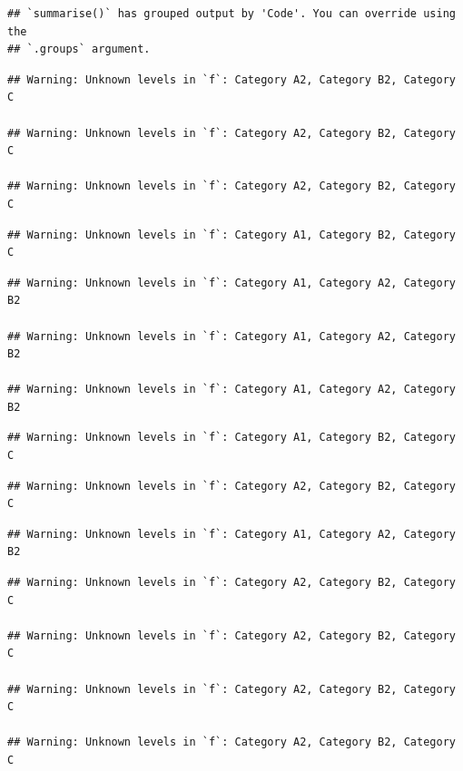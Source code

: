\documentclass[preprint, 3p,
authoryear]{elsarticle} %
\begin{document}
\begin{verbatim}
## `summarise()` has grouped output by 'Code'. You can override using the
## `.groups` argument.
\end{verbatim}

\begin{verbatim}
## Warning: Unknown levels in `f`: Category A2, Category B2, Category C

## Warning: Unknown levels in `f`: Category A2, Category B2, Category C

## Warning: Unknown levels in `f`: Category A2, Category B2, Category C
\end{verbatim}

\begin{verbatim}
## Warning: Unknown levels in `f`: Category A1, Category B2, Category C
\end{verbatim}

\begin{verbatim}
## Warning: Unknown levels in `f`: Category A1, Category A2, Category B2

## Warning: Unknown levels in `f`: Category A1, Category A2, Category B2

## Warning: Unknown levels in `f`: Category A1, Category A2, Category B2
\end{verbatim}

\begin{verbatim}
## Warning: Unknown levels in `f`: Category A1, Category B2, Category C
\end{verbatim}

\begin{verbatim}
## Warning: Unknown levels in `f`: Category A2, Category B2, Category C
\end{verbatim}

\begin{verbatim}
## Warning: Unknown levels in `f`: Category A1, Category A2, Category B2
\end{verbatim}

\begin{verbatim}
## Warning: Unknown levels in `f`: Category A2, Category B2, Category C

## Warning: Unknown levels in `f`: Category A2, Category B2, Category C

## Warning: Unknown levels in `f`: Category A2, Category B2, Category C

## Warning: Unknown levels in `f`: Category A2, Category B2, Category C
\end{verbatim}
\end{document}
